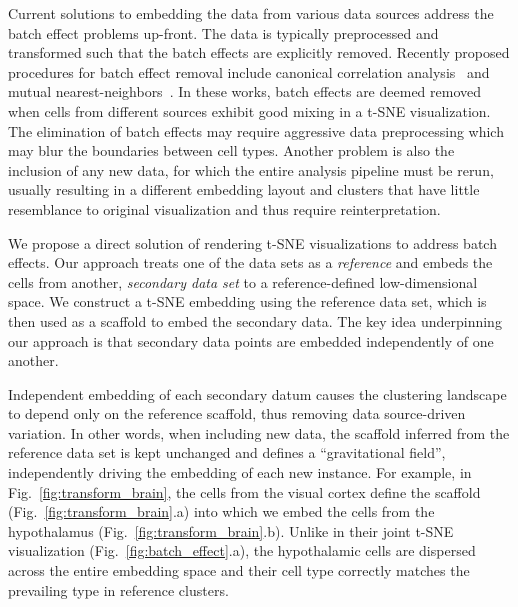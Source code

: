 \documentclass[runningheads]{llncs}
\begin{document}
Current solutions to embedding the data from various data sources address the
batch effect problems up-front. The data is typically preprocessed and
transformed such that the batch effects are explicitly removed. Recently
proposed procedures for batch effect removal include canonical correlation
analysis~\cite{Butler2018} and mutual
nearest-neighbors~\cite{Haghverdi2018,Stuart2019}.  In these works, batch
effects are deemed removed when cells from different sources exhibit good mixing
in a t-SNE visualization. The elimination of batch effects may require
aggressive data preprocessing which may blur the boundaries between cell types.
Another problem is also the inclusion of any new data, for which the entire
analysis pipeline must be rerun, usually resulting in a different embedding
layout and clusters that have little resemblance to original visualization and
thus require reinterpretation.

We propose a direct solution of rendering t-SNE visualizations to address
batch effects. Our approach treats one of the data sets as a {\em reference}
and embeds the cells from another, {\em secondary data set} to a reference-defined
low-dimensional space.  We construct a t\nobreakdash -SNE embedding using the
reference data set, which is then used as a scaffold to embed the
secondary data. The key idea underpinning our approach is that secondary data
points are embedded independently of one another.

Independent embedding of each secondary datum causes the clustering landscape
to depend only on the reference scaffold, thus removing data source-driven
variation. In other words, when including new data, the scaffold inferred from
the reference data set is kept unchanged and defines a ``gravitational field'',
independently driving the embedding of each new instance. For example, in
Fig.~\ref{fig:transform_brain}, the cells from the visual cortex define the
scaffold (Fig.~\ref{fig:transform_brain}.a) into which we embed the cells from
the hypothalamus (Fig.~\ref{fig:transform_brain}.b). Unlike in their joint
t\nobreakdash -SNE visualization (Fig.~\ref{fig:batch_effect}.a), the
hypothalamic cells are dispersed across the entire embedding space and their
cell type correctly matches the prevailing type in reference clusters.
\end{document}
